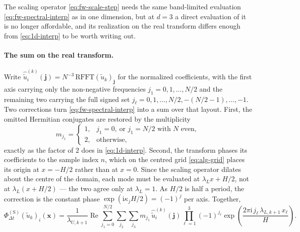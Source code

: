 \documentclass{article}
\begin{document}
The scaling operator \eqref{eq:fw-scale-step} needs the same band-limited
evaluation \eqref{eq:fw-spectral-interp} as in one dimension, but at $d = 3$ a
direct evaluation of it is no longer affordable, and its realization on the
real transform differs enough from \eqref{eq:1d-interp} to be worth writing
out.

\paragraph{The sum on the real transform.}
Write $\hat{\tilde u}_i^{(k)}(\mathbf{j}) = N^{-3}\,\mathrm{RFFT}(\tilde u_k)_{\mathbf{j}}$
for the normalized coefficients, with the first axis carrying only the
non-negative frequencies $j_1 = 0, 1, \dots, N/2$ and the remaining two
carrying the full signed set $j_\ell = 0, 1, \dots, N/2, -(N/2-1), \dots, -1$.
Two corrections turn \eqref{eq:fw-spectral-interp} into a sum over that
layout. First, the omitted Hermitian conjugates are restored by the
multiplicity
\begin{equation}\label{eq:ns-interp-multiplicity}
  m_{j_1} =
  \begin{cases}
    1, & j_1 = 0, \ \text{or } j_1 = N/2 \text{ with } N \text{ even}, \\
    2, & \text{otherwise},
  \end{cases}
\end{equation}
exactly as the factor of $2$ does in \eqref{eq:1d-interp}. Second, the
transform phases its coefficients to the sample index $n$, which on the
centred grid \eqref{eq:alg-grid} places its origin at $x = -H/2$ rather than
at $x = 0$. Since the scaling operator dilates about the centre of the domain,
each mode must be evaluated at $\lambda_L x + H/2$, not at
$\lambda_L (x + H/2)$ --- the two agree only at $\lambda_L = 1$. As $H/2$ is
half a period, the correction is the constant phase
$\exp(\mathrm{i} \kappa_j H/2) = (-1)^{j}$ per axis. Together,
\begin{equation}\label{eq:ns-interp}
  \Phi_{\Delta t}^{(\mathrm{S})}(\tilde u_k)_i(\mathbf{x})
  = \frac{1}{\lambda_{U,k+1}} \operatorname{Re}
    \sum_{j_1 = 0}^{N/2} \sum_{j_2} \sum_{j_3}
      m_{j_1}\, \hat{\tilde u}_i^{(k)}(\mathbf{j})
      \prod_{\ell=1}^{3} (-1)^{j_\ell}
      \exp\!\left( \frac{2\pi \mathrm{i}\, j_\ell\, \lambda_{L,k+1}\, x_\ell}{H} \right).
\end{equation}
\end{document}
